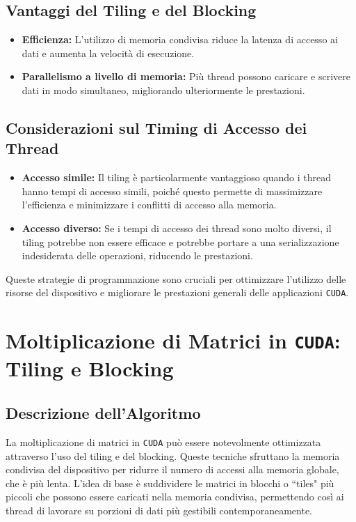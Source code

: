 \subsection{Vantaggi del Tiling e del Blocking}
\begin{itemize}
    \item \textbf{Efficienza:} L'utilizzo di memoria condivisa riduce la latenza di 
    accesso ai dati e aumenta la velocità di esecuzione.
    \item \textbf{Parallelismo a livello di memoria:} Più thread possono caricare e 
    scrivere dati in modo simultaneo, migliorando ulteriormente le prestazioni.
\end{itemize}

\subsection{Considerazioni sul Timing di Accesso dei Thread}
\begin{itemize}
    \item \textbf{Accesso simile:} Il tiling è particolarmente vantaggioso quando i 
    thread hanno tempi di accesso simili, poiché questo permette di massimizzare 
    l'efficienza e minimizzare i conflitti di accesso alla memoria.
    \item \textbf{Accesso diverso:} Se i tempi di accesso dei thread sono molto 
    diversi, il tiling potrebbe non essere efficace e potrebbe portare a una 
    serializzazione indesiderata delle operazioni, riducendo le prestazioni.
\end{itemize}

Queste strategie di programmazione sono cruciali per ottimizzare l'utilizzo delle 
risorse del dispositivo e migliorare le prestazioni generali delle applicazioni 
\texttt{CUDA}.

\section{Moltiplicazione di Matrici in \texttt{CUDA}: Tiling e Blocking}

\subsection{Descrizione dell'Algoritmo}
La moltiplicazione di matrici in \texttt{CUDA} può essere notevolmente
ottimizzata attraverso l'uso del tiling e del blocking. Queste tecniche
sfruttano la memoria condivisa del dispositivo per ridurre il numero di
accessi alla memoria globale, che è più lenta. L'idea di base è suddividere
le matrici in blocchi o ``tiles" più piccoli che possono essere caricati nella
memoria condivisa, permettendo così ai thread di lavorare su porzioni di dati 
più gestibili contemporaneamente.

